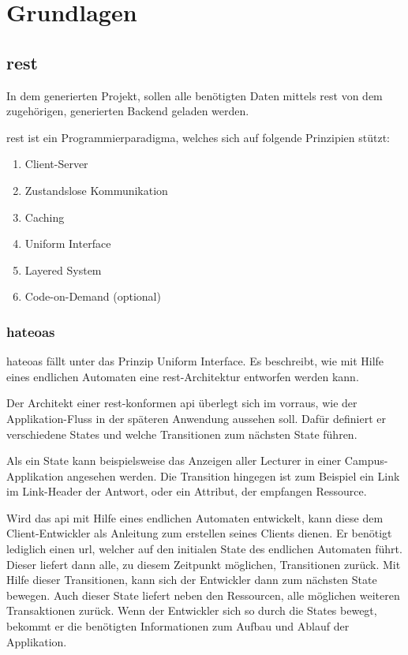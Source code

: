 \chapter{Grundlagen}\label{ch:basics}
\section{\acf{rest}}\label{sec:rest}
In dem generierten Projekt, sollen alle benötigten Daten mittels \ac{rest} von dem zugehörigen, generierten Backend geladen werden. 

\ac{rest} \cite{rest_fielding} ist ein Programmierparadigma, welches sich auf folgende Prinzipien stützt:


\begin{enumerate}
	\item  Client-Server
	\item  Zustandslose Kommunikation
	\item  Caching
	\item  Uniform Interface
	\item  Layered System
	\item  Code-on-Demand (optional)
\end{enumerate}

\subsection{\acf{hateoas}}\label{sec:hateoas}
\ac{hateoas} fällt unter das Prinzip Uniform Interface. Es beschreibt, wie mit Hilfe eines endlichen Automaten eine \ac{rest}-Architektur entworfen werden kann.

Der Architekt einer \ac{rest}-konformen \acf{api} überlegt sich im vorraus, wie der Applikation-Fluss in der späteren Anwendung aussehen soll. Dafür definiert er verschiedene States und welche Transitionen zum nächsten State führen.

Als ein State kann beispielsweise das Anzeigen aller Lecturer in einer Campus-Applikation angesehen werden.
Die Transition hingegen ist zum Beispiel ein Link im Link-Header der Antwort, oder ein Attribut, der empfangen Ressource. 

Wird das \ac{api} mit Hilfe eines endlichen Automaten entwickelt, kann diese dem Client-Entwickler als Anleitung zum erstellen seines Clients dienen. Er benötigt lediglich einen \acf{url}, welcher auf den initialen State des endlichen Automaten führt. Dieser liefert dann alle, zu diesem Zeitpunkt möglichen, Transitionen zurück. Mit Hilfe dieser Transitionen, kann sich der Entwickler dann zum nächsten State bewegen. Auch dieser State liefert neben den Ressourcen, alle möglichen weiteren Transaktionen zurück. 
Wenn der Entwickler sich so durch die States bewegt, bekommt er die benötigten Informationen zum Aufbau und Ablauf der Applikation.

